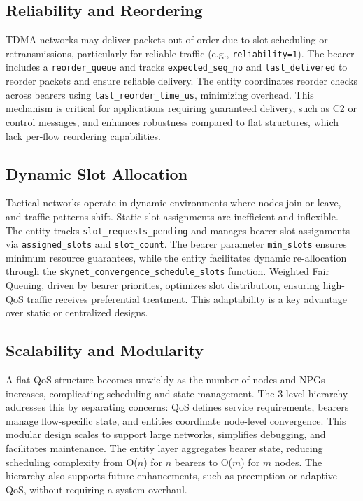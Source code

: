 \documentclass{article}
\begin{document}
\subsection{Reliability and Reordering}
TDMA networks may deliver packets out of order due to slot scheduling or retransmissions,
particularly for reliable traffic (e.g., \texttt{reliability=1}). The bearer includes
a \texttt{reorder\_queue} and tracks \texttt{expected\_seq\_no} and \texttt{last\_delivered} to
reorder packets and ensure reliable delivery. The entity coordinates
reorder checks across bearers using \texttt{last\_reorder\_time\_us}, minimizing overhead. This
mechanism is critical for applications requiring guaranteed delivery, such as C2 or control
messages, and enhances robustness compared to flat structures, which lack per-flow reordering
capabilities.

\subsection{Dynamic Slot Allocation}
Tactical networks operate in dynamic environments where nodes join or leave, and traffic patterns
shift. Static slot assignments are inefficient and inflexible. The entity
tracks \texttt{slot\_requests\_pending} and manages bearer slot assignments via
\texttt{assigned\_slots} and \texttt{slot\_count}. The bearer parameter
\texttt{min\_slots} ensures minimum resource guarantees, while the entity facilitates dynamic
re-allocation through the \texttt{skynet\_convergence\_schedule\_slots} function. Weighted Fair
Queuing, driven by bearer priorities, optimizes slot distribution, ensuring high-QoS traffic
receives preferential treatment. This adaptability is a key advantage over static or centralized
designs.

\subsection{Scalability and Modularity}
A flat QoS structure becomes unwieldy as the number of nodes and NPGs increases, complicating
scheduling and state management. The 3-level hierarchy addresses this by separating concerns: QoS
defines service requirements, bearers manage flow-specific state, and entities coordinate node-level
convergence. This modular design scales to support large networks, simplifies debugging, and
facilitates maintenance. The entity layer aggregates bearer state, reducing scheduling complexity
from O($n$) for $n$ bearers to O($m$) for $m$ nodes. The hierarchy also supports future
enhancements, such as preemption or adaptive QoS, without requiring a system overhaul.
\end{document}
